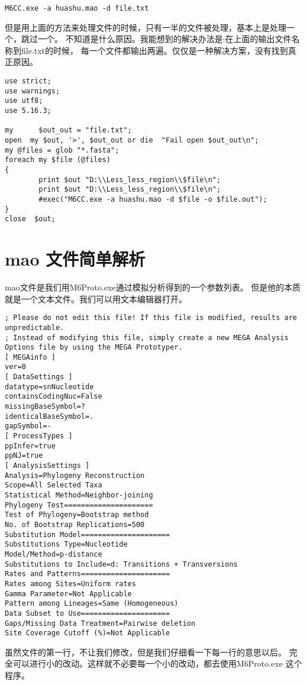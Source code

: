 \documentclass{ctexart}
\begin{document}
\lstset{frame=trBL,frameround=fttt,breaklines=true,language=Perl}
\begin{lstlisting}
M6CC.exe -a huashu.mao -d file.txt
\end{lstlisting}
但是用上面的方法来处理文件的时候，只有一半的文件被处理，基本上是处理一个，跳过一个。
不知道是什么原因。我能想到的解决办法是:在上面的输出文件名称到file.txt的时候，
每一个文件都输出两遍。仅仅是一种解决方案，没有找到真正原因。

\lstset{frame=trBL,frameround=fttt,breaklines=true,language=Perl}
\begin{lstlisting}
use strict;
use warnings;
use utf8;
use 5.16.3;

my      $out_out = "file.txt";
open  my $out, '>', $out_out or die  "Fail open $out_out\n";
my @files = glob "*.fasta";
foreach my $file (@files)
{
        print $out "D:\\Less_less_region\\$file\n";
        print $out "D:\\Less_less_region\\$file\n";
        #exec("M6CC.exe -a huashu.mao -d $file -o $file.out");
}
close  $out;
\end{lstlisting}
\section{mao 文件简单解析}
\label{sec-4}

mao文件是我们用M6Proto.exe通过模拟分析得到的一个参数列表。
但是他的本质就是一个文本文件。我们可以用文本编辑器打开。

\lstset{frame=trBL,frameround=fttt,breaklines=true,language=Perl}
\begin{lstlisting}
; Please do not edit this file! If this file is modified, results are unpredictable.
; Instead of modifying this file, simply create a new MEGA Analysis Options file by using the MEGA Prototyper.
[ MEGAinfo ]
ver=0
[ DataSettings ]
datatype=snNucleotide
containsCodingNuc=False
missingBaseSymbol=?
identicalBaseSymbol=.
gapSymbol=-
[ ProcessTypes ]
ppInfer=true
ppNJ=true
[ AnalysisSettings ]
Analysis=Phylogeny Reconstruction
Scope=All Selected Taxa
Statistical Method=Neighbor-joining
Phylogeny Test=====================
Test of Phylogeny=Bootstrap method
No. of Bootstrap Replications=500
Substitution Model=====================
Substitutions Type=Nucleotide
Model/Method=p-distance
Substitutions to Include=d: Transitions + Transversions
Rates and Patterns=====================
Rates among Sites=Uniform rates
Gamma Parameter=Not Applicable
Pattern among Lineages=Same (Homogeneous)
Data Subset to Use=====================
Gaps/Missing Data Treatment=Pairwise deletion
Site Coverage Cutoff (%)=Not Applicable
\end{lstlisting}
虽然文件的第一行，不让我们修改，但是我们仔细看一下每一行的意思以后。
完全可以进行小的改动。这样就不必要每一个小的改动，都去使用M6Proto.exe
这个程序。
\end{document}
